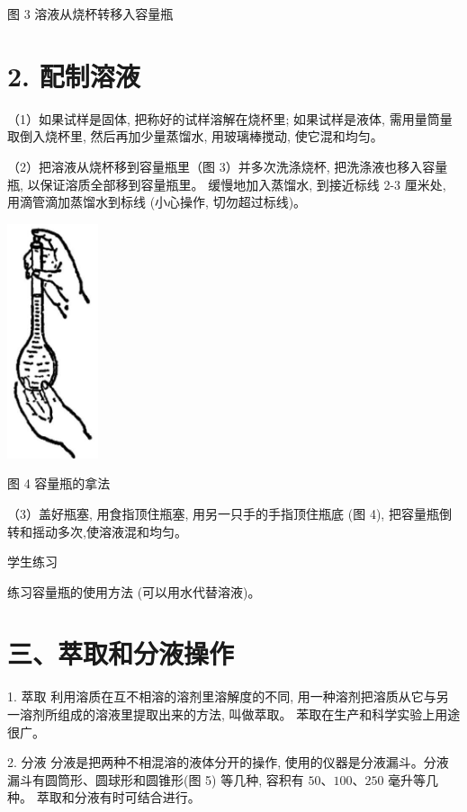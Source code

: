 \documentclass[10pt]{article}
\begin{document}
图 3 溶液从烧杯转移入容量瓶

\section*{2. 配制溶液}

（1）如果试样是固体, 把称好的试样溶解在烧杯里; 如果试样是液体, 需用量筒量取倒入烧杯里, 然后再加少量蒸馏水, 用玻璃棒搅动, 使它混和均匀。

（2）把溶液从烧杯移到容量瓶里（图 3）并多次洗涤烧杯, 把洗涤液也移入容量瓶, 以保证溶质全部移到容量瓶里。 缓慢地加入蒸馏水, 到接近标线 2-3 厘米处, 用滴管滴加蒸馏水到标线 (小心操作, 切勿超过标线)。

\begin{center}
\includegraphics[max width=0.2\textwidth]{images/01912d0f-097c-7e75-8f32-4f326cd86c9f_154_628773.jpg}
\end{center}

图 4 容量瓶的拿法

（3）盖好瓶塞, 用食指顶住瓶塞, 用另一只手的手指顶住瓶底 (图 4), 把容量瓶倒转和摇动多次,使溶液混和均匀。

学生练习

练习容量瓶的使用方法 (可以用水代替溶液)。

\section*{三、萃取和分液操作}

1. 萃取 利用溶质在互不相溶的溶剂里溶解度的不同, 用一种溶剂把溶质从它与另一溶剂所组成的溶液里提取出来的方法, 叫做萃取。 苯取在生产和科学实验上用途很广。

2. 分液 分液是把两种不相混溶的液体分开的操作, 使用的仪器是分液漏斗。分液漏斗有圆筒形、圆球形和圆锥形(图 5) 等几种, 容积有 \({50}\text{、}{100}\text{、}{250}\) 毫升等几种。 萃取和分液有时可结合进行。
\end{document}
